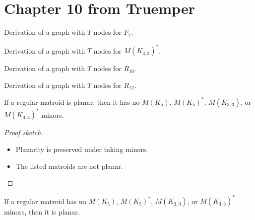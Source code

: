 \section{Chapter 10 from Truemper}

\begin{proposition}[10.2.4]
  \label{prop:10.2.4}
  Derivation of a graph with $T$ nodes for $F_{7}$.
\end{proposition}

\begin{proposition}[10.2.6]
  \label{prop:10.2.6}
  Derivation of a graph with $T$ nodes for $M(K_{3,3})^{*}$.
\end{proposition}

\begin{proposition}[10.2.8]
  \label{prop:10.2.8}
  Derivation of a graph with $T$ nodes for $R_{10}$.
\end{proposition}

\begin{proposition}[10.2.9]
  \label{prop:10.2.9}
  Derivation of a graph with $T$ nodes for $R_{12}$.
\end{proposition}

\begin{theorem}[10.2.11 only if]
  \label{thm:10.2.11.only_if}
  If a regular matroid is planar, then it has no $M(K_{5})$, $M(K_{5})^{*}$, $M(K_{3,3})$, or $M(K_{3,3})^{*}$ minors.
\end{theorem}

\begin{proof}[Proof sketch]
  \begin{itemize}
    \item Planarity is preserved under taking minors.
    \item The listed matroids are not planar.
  \end{itemize}
\end{proof}

\begin{theorem}[10.2.11 if]
  \label{thm:10.2.11.if}
  If a regular matroid has no $M(K_{5})$, $M(K_{5})^{*}$, $M(K_{3,3})$, or $M(K_{3,3})^{*}$ minors, then it is planar.
\end{theorem}

